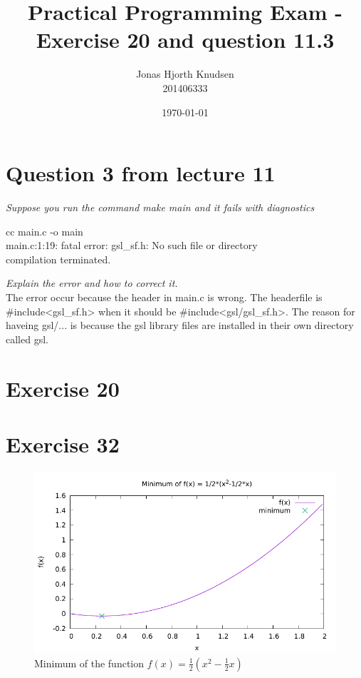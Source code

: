 \documentclass[a4paper,10pt,onecolumn]{article}
\begin{document}
\title{Practical Programming Exam - Exercise 20 and question 11.3}
\author{Jonas Hjorth Knudsen\\ 201406333}
\date{\today}

\maketitle



\section{Question 3 from lecture 11}

\textit{Suppose you run the command \emph{make main} and it fails with diagnostics}

\begin{framed}
cc \hspace{1cm} main.c \hspace{1cm} -o main\\
main.c:1:19: fatal error: gsl\_sf.h: No such file or directory\\
compilation terminated.
\end{framed}

\textit{Explain the error and how to correct it.}\\

The error occur because the header in main.c is wrong. The headerfile is \#include\textless gsl\_sf.h\textgreater
 when it should be \#include\textless gsl/gsl\_sf.h\textgreater.
The reason for haveing gsl/... is because the gsl library files are installed in their own directory called gsl.



\section{Exercise 20}






\section{Exercise 32}

\begin{figure}
	\centering
	\includegraphics{plotMin.pdf}
	\caption{Minimum of the function $f(x) = \frac{1}{2} (x^2-\frac{1}{2}x)$}
	\label{fig:min}
\end{figure}
\end{document}
